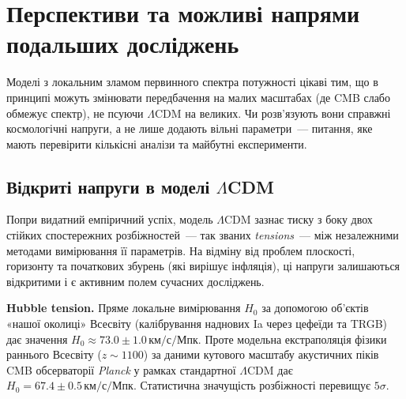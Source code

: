 
\chapter{Перспективи та можливі напрями подальших досліджень}
\label{sec:future_research}


Моделі з локальним зламом первинного спектра потужності цікаві тим, що в принципі можуть змінювати передбачення на малих масштабах (де CMB слабо обмежує спектр), не псуючи $\Lambda$CDM на великих. Чи розв'язують вони справжні космологічні напруги, а не лише додають вільні параметри~--- питання, яке мають перевірити кількісні аналізи та майбутні експерименти.

\section{Відкриті напруги в моделі $\Lambda$CDM}
\label{sec:tensions}

Попри видатний емпіричний успіх, модель $\Lambda$CDM зазнає тиску з боку двох
стійких спостережних розбіжностей~--- так званих \emph{tensions}~---
між незалежними методами вимірювання її параметрів. На відміну від проблем
плоскості, горизонту та початкових збурень (які вирішує інфляція),
ці напруги залишаються відкритими і є активним полем сучасних досліджень.

\textbf{Hubble tension.}
Пряме локальне вимірювання $H_0$ за допомогою об'єктів «нашої околиці» Всесвіту (калібрування наднових Ia через цефеїди та TRGB) дає значення $H_0 \approx 73.0 \pm 1.0\,\text{км/с/Мпк}$. Проте модельна екстраполяція фізики раннього Всесвіту ($z \sim 1100$) за даними кутового масштабу акустичних піків CMB обсерваторії \emph{Planck} у рамках стандартної $\Lambda$CDM дає $H_0 = 67.4 \pm 0.5\,\text{км/с/Мпк}$. Статистична значущість розбіжності перевищує $5\sigma$.

